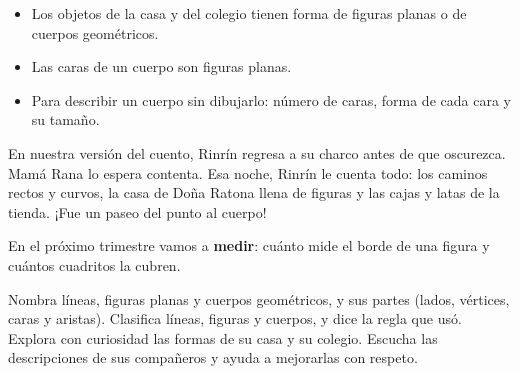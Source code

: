 \documentclass[11pt]{article}
\begin{document}
\begin{resumen}
\begin{itemize}
  \item Los objetos de la casa y del colegio tienen forma de figuras planas
        o de cuerpos geométricos.
  \item Las caras de un cuerpo son figuras planas.
  \item Para describir un cuerpo sin dibujarlo: número de caras, forma de
        cada cara y su tamaño.
\end{itemize}
\end{resumen}


En nuestra versión del cuento, Rinrín regresa a su charco antes de que
oscurezca. Mamá Rana lo espera contenta. Esa noche, Rinrín le cuenta todo:
los caminos rectos y curvos, la casa de Doña Ratona llena de figuras y las
cajas y latas de la tienda. ¡Fue un paseo del punto al cuerpo!

En el próximo trimestre vamos a \textbf{medir}: cuánto mide el borde de una
figura y cuántos cuadritos la cubren.

\matrizevaluacion
  {Nombra líneas, figuras planas y cuerpos geométricos, y sus partes (lados, vértices, caras y aristas).}
  {Clasifica líneas, figuras y cuerpos, y dice la regla que usó.}
  {Explora con curiosidad las formas de su casa y su colegio.}
  {Escucha las descripciones de sus compañeros y ayuda a mejorarlas con respeto.}

\autoevaluacion

\seguimientodocente
\end{document}
